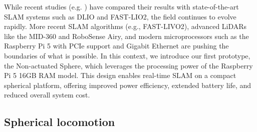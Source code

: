 \documentclass[conference]{IEEEtran}
\begin{document}
While recent studies (e.g. \cite{Kalman_filter_sphere}) have compared their results with state-of-the-art SLAM systems such as DLIO\cite{dlio} and FAST-LIO2\cite{fastlio2}, the field continues to evolve rapidly. 
More recent SLAM algorithms (e.g., FAST-LIVO2\cite{fastlivo2}), advanced LiDARs like the MID-360 and RoboSense Airy, and modern microprocessors such as the Raspberry Pi 5 with PCIe support and Gigabit Ethernet are pushing the boundaries of what is possible. 
In this context, we introduce our first prototype, the Non-actuated Sphere, which leverages the processing power of the Raspberry Pi 5 16GB RAM model. 
This design enables real-time SLAM on a compact spherical platform,  offering improved power efficiency, extended battery life, and reduced overall system cost.
\subsection{Spherical locomotion}

\label{sec:state-of-the-art}
\end{document}
